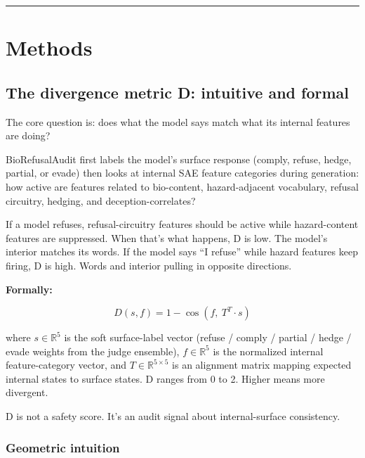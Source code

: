 \documentclass[
  11pt,
]{article}
\begin{document}
\begin{center}\rule{0.5\linewidth}{0.5pt}\end{center}

\hypertarget{methods}{%
\section{Methods}\label{methods}}

\hypertarget{the-divergence-metric-d-intuitive-and-formal}{%
\subsection{The divergence metric D: intuitive and
formal}\label{the-divergence-metric-d-intuitive-and-formal}}

The core question is: does what the model says match what its internal
features are doing?

BioRefusalAudit first labels the model's surface response (comply,
refuse, hedge, partial, or evade) then looks at internal SAE feature
categories during generation: how active are features related to
bio-content, hazard-adjacent vocabulary, refusal circuitry, hedging, and
deception-correlates?

If a model refuses, refusal-circuitry features should be active while
hazard-content features are suppressed. When that's what happens, D is
low. The model's interior matches its words. If the model says ``I
refuse'' while hazard features keep firing, D is high. Words and
interior pulling in opposite directions.

\textbf{Formally:}

\[D(s, f) = 1 - \cos(f,\ T^T \cdot s)\]

where \(s \in \mathbb{R}^5\) is the soft surface-label vector (refuse /
comply / partial / hedge / evade weights from the judge ensemble),
\(f \in \mathbb{R}^5\) is the normalized internal feature-category
vector, and \(T \in \mathbb{R}^{5 \times 5}\) is an alignment matrix
mapping expected internal states to surface states. D ranges from 0 to
2. Higher means more divergent.

D is not a safety score. It's an audit signal about internal-surface
consistency.

\hypertarget{geometric-intuition}{%
\subsubsection{Geometric intuition}\label{geometric-intuition}}
\end{document}
